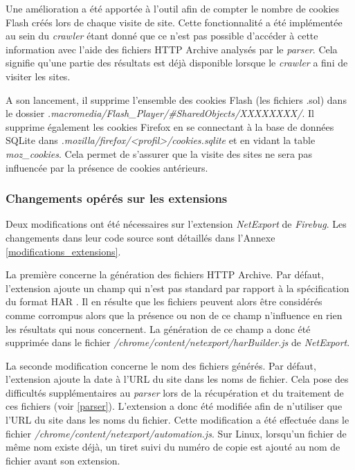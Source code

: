 Une amélioration a été apportée à l'outil afin de compter le nombre de cookies Flash créés lors de chaque visite de site. Cette fonctionnalité a été implémentée au sein du \textit{crawler} étant donné que ce n'est pas possible d'accéder à cette information avec l'aide des fichiers HTTP Archive analysés par le \textit{parser}. Cela signifie qu'une partie des résultats est déjà disponible lorsque le \textit{crawler} a fini de visiter les sites.

A son lancement, il supprime l'ensemble des cookies Flash (les fichiers .sol) dans le dossier \textit{.macromedia/Flash\_Player/\#SharedObjects/XXXXXXXX/}. Il supprime également les cookies Firefox en se connectant à la base de données SQLite dans \textit{.mozilla/firefox/<profil>/cookies.sqlite} et en vidant la table \textit{moz\_cookies}. Cela permet de s'assurer que la visite des sites ne sera pas influencée par la présence de cookies antérieurs.

\subsubsection{Changements opérés sur les extensions}
\label{changements_extensions}
Deux modifications ont été nécessaires sur l'extension \textit{NetExport} de \textit{Firebug}. Les changements dans leur code source sont détaillés dans l'Annexe \ref{modifications_extensions}.

La première concerne la génération des fichiers HTTP Archive. Par défaut, l'extension ajoute un champ qui n'est pas standard par rapport à la spécification du format HAR \cite{har_spec}. Il en résulte que les fichiers peuvent alors être considérés comme corrompus alors que la présence ou non de ce champ n'influence en rien les résultats qui nous concernent. La génération de ce champ a donc été supprimée dans le fichier \textit{/chrome/content/netexport/harBuilder.js} de \textit{NetExport}.

La seconde modification concerne le nom des fichiers générés. Par défaut, l'extension ajoute la date à l'URL du site dans les noms de fichier. Cela pose des difficultés supplémentaires au \textit{parser} lors de la récupération et du traitement de ces fichiers (voir \autoref{parser}). L'extension a donc été modifiée afin de n'utiliser que l'URL du site dans les noms du fichier. Cette modification a été effectuée dans le fichier \textit{/chrome/content/netexport/automation.js}. Sur Linux, lorsqu'un fichier de même nom existe déjà, un tiret suivi du numéro de copie est ajouté au nom de fichier avant son extension.

